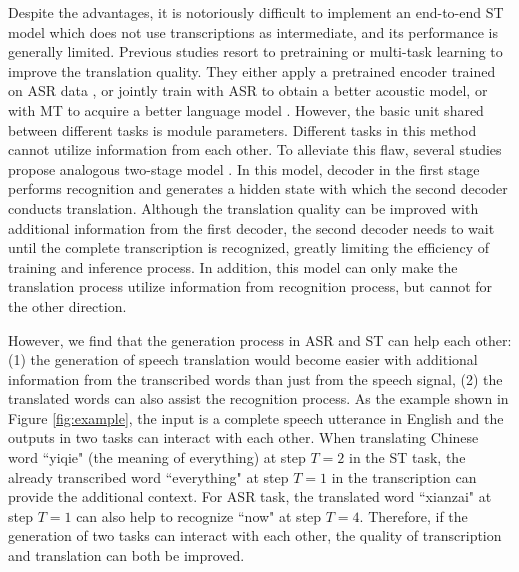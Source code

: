 \documentclass[letterpaper]{article} %
\begin{document}
Despite the advantages, it is notoriously difficult to implement an end-to-end ST model which does not use transcriptions as intermediate, and its performance is generally limited. 
Previous studies resort to pretraining or multi-task learning to improve the translation quality. They either apply a pretrained encoder trained on ASR data \cite{bansal2018pre}, or jointly train with ASR to obtain a better acoustic model, or with MT to acquire a better language model \cite{weiss2017sequence,anastasopoulos2018leveraging,berard2018end}. However, the basic unit shared between different tasks is module parameters. Different tasks in this method cannot utilize information from each other. To alleviate this flaw, several studies propose analogous two-stage model  \cite{kano2017structured,anastasopoulos2018tied,sperber2019attention}.
In this model, decoder in the first stage performs recognition and generates a hidden state with which the second decoder conducts translation. Although the translation quality can be improved with additional information from the first decoder, the second decoder needs to wait until the complete transcription is recognized, greatly limiting the efficiency of training and inference process. In addition, this model can only make the translation process utilize information from recognition process, but cannot for the other direction.

However, we find that the generation process in ASR and ST can help each other: (1) the generation of speech translation would become easier with additional information from the transcribed words than just from the speech signal, (2) the translated words can also assist the recognition process. As the example shown in Figure \ref{fig:example}, the input is a complete speech utterance in English and the outputs in two tasks can interact with each other. When translating Chinese word ``yiqie" (the meaning of everything) at step $T=2$ in the ST task, the already transcribed word ``everything" at step $T=1$ in the transcription can provide the additional context. For ASR task, the translated word ``xianzai" at step $T=1$ can also help to recognize ``now" at step $T=4$. Therefore, if the generation of two tasks can interact with each other, the quality of transcription and translation can both be improved.
\end{document}
